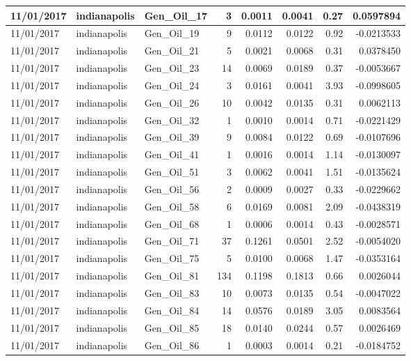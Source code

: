 \documentclass[
  letterpaper,
  DIV=11,
  numbers=noendperiod]{scrartcl}
\begin{document}
\begin{tabular}{l|l|l|r|r|r|r|r}
\hline
11/01/2017 & indianapolis & Gen\_Oil\_17 & 3 & 0.0011 & 0.0041 & 0.27 & 0.0597894\\
\hline
11/01/2017 & indianapolis & Gen\_Oil\_19 & 9 & 0.0112 & 0.0122 & 0.92 & -0.0213533\\
\hline
11/01/2017 & indianapolis & Gen\_Oil\_21 & 5 & 0.0021 & 0.0068 & 0.31 & 0.0378450\\
\hline
11/01/2017 & indianapolis & Gen\_Oil\_23 & 14 & 0.0069 & 0.0189 & 0.37 & -0.0053667\\
\hline
11/01/2017 & indianapolis & Gen\_Oil\_24 & 3 & 0.0161 & 0.0041 & 3.93 & -0.0998605\\
\hline
11/01/2017 & indianapolis & Gen\_Oil\_26 & 10 & 0.0042 & 0.0135 & 0.31 & 0.0062113\\
\hline
11/01/2017 & indianapolis & Gen\_Oil\_32 & 1 & 0.0010 & 0.0014 & 0.71 & -0.0221429\\
\hline
11/01/2017 & indianapolis & Gen\_Oil\_39 & 9 & 0.0084 & 0.0122 & 0.69 & -0.0107696\\
\hline
11/01/2017 & indianapolis & Gen\_Oil\_41 & 1 & 0.0016 & 0.0014 & 1.14 & -0.0130097\\
\hline
11/01/2017 & indianapolis & Gen\_Oil\_51 & 3 & 0.0062 & 0.0041 & 1.51 & -0.0135624\\
\hline
11/01/2017 & indianapolis & Gen\_Oil\_56 & 2 & 0.0009 & 0.0027 & 0.33 & -0.0229662\\
\hline
11/01/2017 & indianapolis & Gen\_Oil\_58 & 6 & 0.0169 & 0.0081 & 2.09 & -0.0438319\\
\hline
11/01/2017 & indianapolis & Gen\_Oil\_68 & 1 & 0.0006 & 0.0014 & 0.43 & -0.0028571\\
\hline
11/01/2017 & indianapolis & Gen\_Oil\_71 & 37 & 0.1261 & 0.0501 & 2.52 & -0.0054020\\
\hline
11/01/2017 & indianapolis & Gen\_Oil\_75 & 5 & 0.0100 & 0.0068 & 1.47 & -0.0353164\\
\hline
11/01/2017 & indianapolis & Gen\_Oil\_81 & 134 & 0.1198 & 0.1813 & 0.66 & 0.0026044\\
\hline
11/01/2017 & indianapolis & Gen\_Oil\_83 & 10 & 0.0073 & 0.0135 & 0.54 & -0.0047022\\
\hline
11/01/2017 & indianapolis & Gen\_Oil\_84 & 14 & 0.0576 & 0.0189 & 3.05 & 0.0083564\\
\hline
11/01/2017 & indianapolis & Gen\_Oil\_85 & 18 & 0.0140 & 0.0244 & 0.57 & 0.0026469\\
\hline
11/01/2017 & indianapolis & Gen\_Oil\_86 & 1 & 0.0003 & 0.0014 & 0.21 & -0.0184752\\

\end{tabular}
\end{document}
